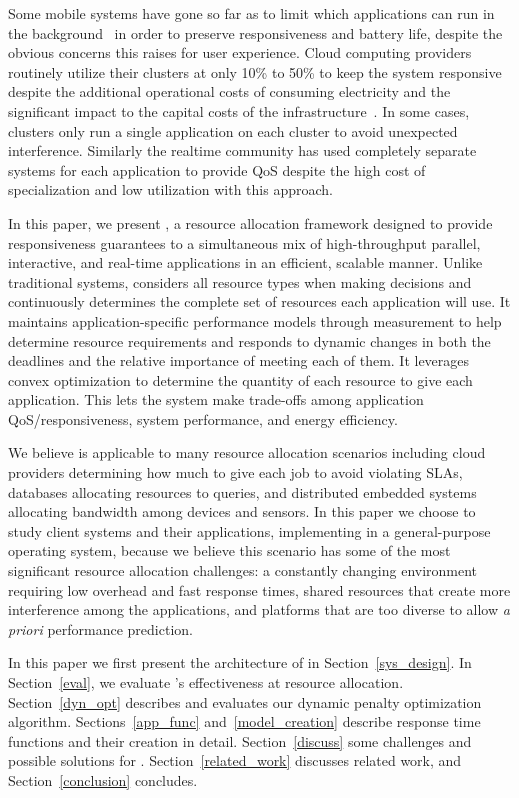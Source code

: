 Some mobile systems have gone so far as to limit which applications can run in the background~\cite{iOsDev} in order to preserve responsiveness and battery life, despite the obvious concerns this raises for user experience.  Cloud computing providers routinely utilize their clusters at only 10\% to 50\% to keep the system responsive despite the additional operational costs of consuming electricity and the significant impact to the capital costs of the infrastructure~\cite{Barroso2009,Hennessy2011}.   In some cases, clusters only run a single application on each cluster to avoid unexpected interference.  Similarly the realtime community has used completely separate systems for each application to provide QoS despite the high cost of specialization and low utilization with this approach.

In this paper, we present \pacora, a resource allocation framework designed to provide responsiveness guarantees to a simultaneous mix of high-throughput parallel, interactive, and real-time applications in an efficient, scalable manner.  Unlike traditional systems, \pacora considers all resource types when making decisions and continuously determines the complete set of resources each application will use.   It maintains application-specific performance models through measurement to help determine resource requirements and responds to dynamic changes in both the deadlines and the relative importance of meeting each of them. It leverages convex optimization to determine the quantity of each resource to give each application. This lets the system make trade-offs among application QoS/responsiveness, system performance, and energy efficiency.

We believe \pacora is applicable to many resource allocation scenarios including cloud providers determining how much to give each job to avoid violating SLAs, databases allocating resources to queries, and distributed embedded systems allocating bandwidth among devices and sensors.  In this paper we choose to study client systems and their applications, implementing \pacora in a general-purpose operating system, because we believe this scenario has some of the most significant resource allocation challenges: a constantly changing environment requiring low overhead and fast response times, shared resources that create more interference among the applications, and platforms that are too diverse to allow \emph{a priori} performance prediction.


In this paper we first present the architecture of \pacora in Section~\ref{sys_design}.  In Section~\ref{eval}, we evaluate \pacora's effectiveness at resource allocation. Section~\ref{dyn_opt} describes and evaluates our dynamic penalty optimization algorithm. Sections~\ref{app_func} and~\ref{model_creation} describe response time functions and their creation in detail.  Section~\ref{discuss} some challenges and possible solutions for \pacora. Section~\ref{related_work} discusses related work, and Section~\ref{conclusion} concludes.
